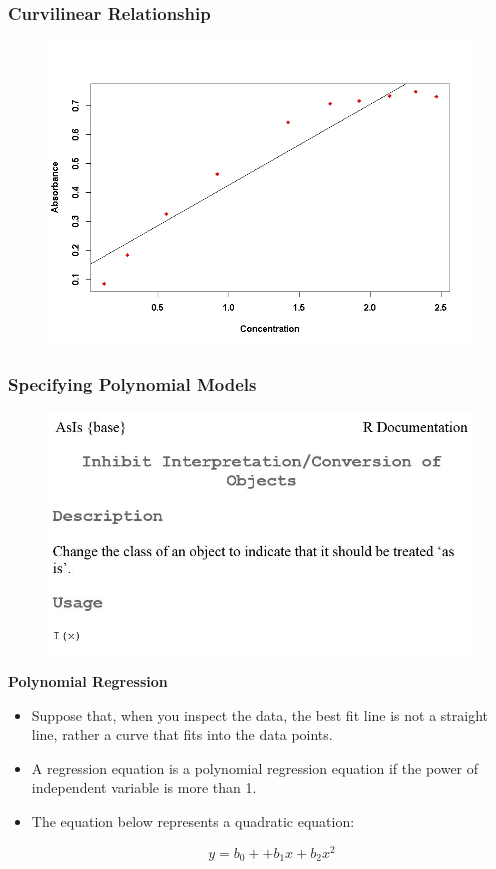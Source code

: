 \documentclass{beamer}
\begin{document}
\begin{frame}
	\frametitle{Curvilinear Relationship}
	\begin{figure}
\centering
\includegraphics[width=1.0\linewidth]{images/ExamQ3plot}
\end{figure}

\end{frame}
\begin{frame}
\frametitle{Specifying Polynomial Models}
	\begin{figure}
\centering
\includegraphics[width=1.0\linewidth]{images/I-Functions}

\end{figure}

\end{frame}
\begin{frame}
	\noindent \textbf{Polynomial Regression}
\large	
	\begin{itemize}
\item Suppose that, when you inspect the data, the best fit line is not a straight line, rather a curve that fits into the data points.
\item 	A regression equation is a polynomial regression equation if the power of independent variable is more than 1. 
\item The equation below represents a quadratic equation:
	
	\[	y=b_0+ +b_1x + b_2x^2\]


	\end{itemize}
\end{frame}
\end{document}
